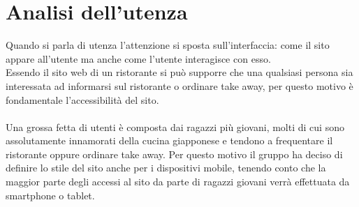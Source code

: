 \documentclass[../relazione.tex]{subfiles}
\begin{document}
\section{Analisi dell'utenza}
		Quando si parla di utenza l'attenzione si sposta sull'interfaccia: come il sito appare all'utente ma anche come l'utente interagisce con esso.\\
		Essendo il sito web di un ristorante si può supporre che una qualsiasi persona sia interessata ad informarsi sul ristorante o ordinare take away, per questo motivo è fondamentale l'accessibilità del sito.\\\\
		Una grossa fetta di utenti è composta dai ragazzi più giovani, molti di cui sono assolutamente innamorati della cucina giapponese e tendono a frequentare il ristorante oppure ordinare take away.
		Per questo motivo il gruppo ha deciso di definire lo stile del sito anche per i dispositivi mobile, tenendo conto che la maggior parte degli accessi al sito da parte di ragazzi giovani verrà effettuata da smartphone o tablet.
\end{document}
